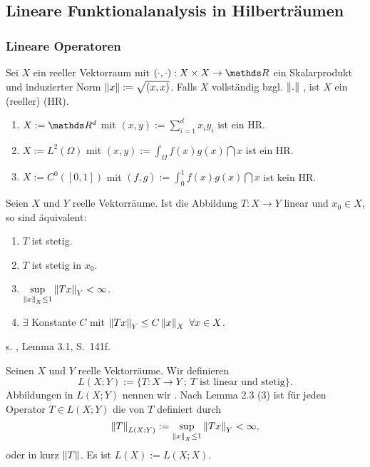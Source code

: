\subsection{Lineare Funktionalanalysis in Hilberträumen}

\subsubsection{Lineare Operatoren}

Sei $X$ ein reeller Vektorraum mit $(\cdot,\cdot):X\times X\to \R$ ein Skalarprodukt und induzierter Norm $\left\Vert x\right\Vert:= \sqrt{(x,x)}$. Falls $X$ vollständig bzgl. $\left\Vert.\right\Vert$ , ist $X$ ein (reeller)  (HR).

\begin{enumerate}[(1)]
	\item $X:= \R^d$ mit $(x,y) := \sum_{i=1}^{d} x_i y_i$ ist ein HR.
	\item $X:= L^2(\Omega)$ mit $(x,y) := \int_{\Omega} f(x)g(x)\dint x $ ist ein HR.
	\item $X:=C^0([0,1])$ mit $(f,g) := \int_{0}^{1} f(x) g(x) \dint x$ ist kein HR.
\end{enumerate}

Seien $X$ und $Y$ reelle Vektorräume.
Ist die Abbildung $T:X\to Y$ linear und $x_0\in X$, so sind äquivalent:
\begin{enumerate}[(1)]
	\item $T$ ist stetig.
	\item $T$ ist stetig in $x_0$.
	\item $\sup\limits_{\left\Vert x\right\Vert_X \le 1} \left\Vert Tx\right\Vert_Y < \infty$.
	\item $\exists$ Konstante $C$ mit $\left\Vert Tx\right\Vert_Y \le C\left\Vert x\right\Vert_X ~\forall x\in X$.
\end{enumerate}
 s. \cite{Alt06}, Lemma 3.1, S.~141f.

Seinen $X$ und $Y$ reelle Vektorräume.
Wir definieren
\[
L(X;Y) := \lbrace T:X\to Y~;~ T \text{ ist linear und stetig} \rbrace.
\]
Abbildungen in $L(X;Y)$ nennen wir .
Nach Lemma 2.3 (3) ist für jeden Operator $T\in L(X;Y)$ die  von $T$ definiert durch
\[
\left\Vert T\right\Vert_{L(X;Y)} := \sup\limits_{\left\Vert x\right\Vert_X\le 1} \left\Vert Tx\right\Vert_Y < \infty,
\]
oder in kurz $\left\Vert T\right\Vert$.
Es ist $L(X) := L(X;X)$.

